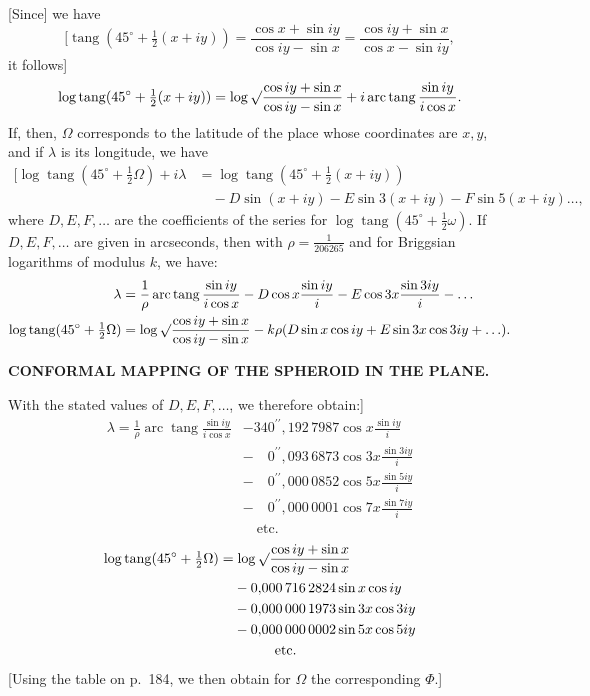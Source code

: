 [Since] we have
\[
[\operatorname{tang}(45^\circ+\tfrac12(x+iy))=
\frac{\cos x+\sin iy}{\cos iy-\sin x}=
\frac{\cos iy+\sin x}{\cos x-\sin iy},
\]
\noindent it follows]
\[
\log\operatorname{tang}(45^\circ+\tfrac12(x+iy))
=\log\surd\frac{\cos iy+\sin x}{\cos iy-\sin x}
+i\operatorname{arc}\operatorname{tang}\frac{\sin iy}{i\cos x}.
\]
If, then, \(\Omega\) corresponds to the latitude of the place whose coordinates are \(x,y\),
and if \(\lambda\) is its longitude, we have
\[
\begin{aligned}
\mathopen{[}\log\operatorname{tang}(45^\circ+\tfrac12\Omega)+i\lambda
  &=\log\operatorname{tang}(45^\circ+\tfrac12(x+iy))\\
  &\quad-D\sin(x+iy)-E\sin3(x+iy)-F\sin5(x+iy)\ldots,
\end{aligned}
\]
\noindent where \(D,E,F,\ldots\) are the coefficients of the series for
\(\log\operatorname{tang}(45^\circ+\tfrac12\omega)\). If \(D,E,F,\ldots\)
are given in arcseconds, then with \(\rho=\tfrac{1}{206265}\) and for
Briggsian logarithms of modulus \(k\), we have:
\[
\begin{aligned}
\lambda&=\frac1\rho\operatorname{arc}\operatorname{tang}\frac{\sin iy}{i\cos x}
-D\cos x\frac{\sin iy}{i}-E\cos3x\frac{\sin3iy}{i}-\ldots\\
\log\operatorname{tang}(45^\circ+\tfrac12\Omega)
&=\log\surd\frac{\cos iy+\sin x}{\cos iy-\sin x}
-k\rho(D\sin x\cos iy+E\sin3x\cos3iy+\ldots).
\end{aligned}
\]

\par\clearpage
\noindent\null\hfill{\small\textbf{CONFORMAL MAPPING OF THE SPHEROID IN THE PLANE.}}\hfill{}\par\medskip

With the stated values of \(D,E,F,\ldots\), we therefore obtain:]
\[
\begin{aligned}
\lambda=\frac1\rho\operatorname{arc}\operatorname{tang}\frac{\sin iy}{i\cos x}
&-340^{\prime\prime}{,}192\,7987\cos x\frac{\sin iy}{i}\\
&-\phantom{34}0^{\prime\prime}{,}093\,6873\cos3x\frac{\sin3iy}{i}\\
&-\phantom{34}0^{\prime\prime}{,}000\,0852\cos5x\frac{\sin5iy}{i}\\
&-\phantom{34}0^{\prime\prime}{,}000\,0001\cos7x\frac{\sin7iy}{i}\\
&\quad\text{etc.}
\end{aligned}
\]
\[
\begin{aligned}
\log\operatorname{tang}(45^\circ+\tfrac12\Omega)
&=\log\surd\frac{\cos iy+\sin x}{\cos iy-\sin x}\\
&\phantom{={}}-0{,}000\,716\,2824\sin x\cos iy\\
&\phantom{={}}-0{,}000\,000\,1973\sin3x\cos3iy\\
&\phantom{={}}-0{,}000\,000\,0002\sin5x\cos5iy\\
&\qquad\qquad\text{etc.}
\end{aligned}
\]
[Using the table on p.\ 184, we then obtain for \(\Omega\) the corresponding \(\Phi\).]

